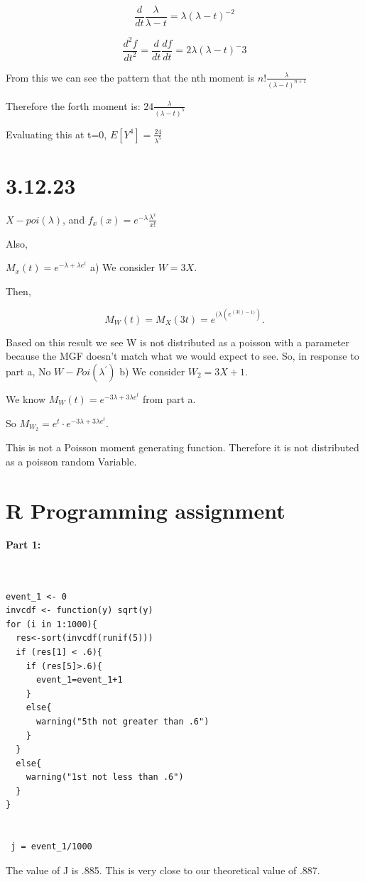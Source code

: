 \documentclass[svgnames]{article}
\begin{document}
$$\frac{d}{dt}\frac{\lambda}{\lambda-t}=\lambda(\lambda-t)^{-2} $$

$$\frac{d^2f}{dt^2}=\frac{d}{dt}\frac{df}{dt}=2\lambda(\lambda-t)^-3 $$

From this we can see the pattern that the nth moment is $n!\frac{\lambda}{{(\lambda-t)^{n+1}}}$

Therefore the forth moment is: $24\frac{\lambda}{(\lambda-t)^{5}}$

Evaluating this at t=0, $E[Y^4]=\frac{24}{\lambda^5}$

\section{3.12.23}

$X - poi(\lambda)$, and $f_x(x) = e^{-\lambda}\frac{\lambda^x}{x!}$

Also,

$M_x(t)=e^{-\lambda + \lambda e^{t}}$
\newline
\newline
\newline
a) We consider $W=3X$.

Then,

$$ M_{W}(t) = M_{X}(3t) = e^{(\lambda  (e^{(3t) - 1)})}.$$

Based on this result we see W is not distributed as a poisson with a parameter because the MGF doesn't match what we would expect to see.
So, in response to part a, No $W - Poi(\lambda^{'})$
\newline
\newline
\newline
b) We consider $W_2=3X+1$.

We know $M_W(t)=e^{-3\lambda + 3\lambda e^{t}}$ from part a.

So $M_{W_{2}}=e^t \cdot e^{-3\lambda + 3\lambda e^{t}}$.

This is not a Poisson moment generating function. Therefore it is not distributed as a poisson random Variable. 


\section{R Programming assignment}

\textbf{Part 1:}
\begin{lstlisting}


event_1 <- 0
invcdf <- function(y) sqrt(y)
for (i in 1:1000){
  res<-sort(invcdf(runif(5)))
  if (res[1] < .6){
    if (res[5]>.6){
      event_1=event_1+1
    }
    else{
      warning("5th not greater than .6")
    }
  }
  else{
    warning("1st not less than .6")
  }
}
 
 
 j = event_1/1000
\end{lstlisting}
The value of J is .885. This is very close to our theoretical value of .887.
\end{document}
